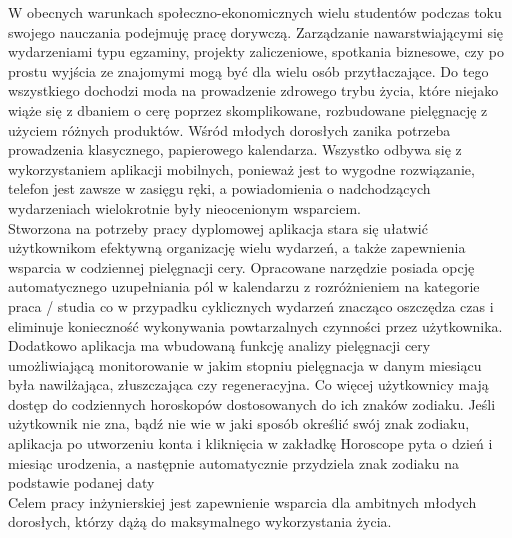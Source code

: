 \phantom{Th} 
W obecnych warunkach społeczno-ekonomicznych wielu studentów podczas toku swojego nauczania podejmuję pracę dorywczą. 
Zarządzanie nawarstwiającymi się wydarzeniami typu egzaminy, projekty zaliczeniowe, spotkania biznesowe, 
czy po prostu wyjścia ze znajomymi mogą być dla wielu osób przytłaczające. 
Do tego wszystkiego dochodzi moda na prowadzenie zdrowego trybu życia, które niejako wiąże się z dbaniem o cerę poprzez skomplikowane,
rozbudowane pielęgnację z użyciem różnych produktów. Wśród młodych dorosłych zanika potrzeba prowadzenia klasycznego, 
papierowego kalendarza. Wszystko odbywa się z wykorzystaniem aplikacji mobilnych, ponieważ jest to wygodne rozwiązanie, 
telefon jest zawsze w zasięgu ręki, a powiadomienia o nadchodzących wydarzeniach wielokrotnie były nieocenionym wsparciem.\\

Stworzona na potrzeby pracy dyplomowej aplikacja stara się ułatwić użytkownikom efektywną organizację wielu wydarzeń,
a także zapewnienia wsparcia w codziennej pielęgnacji cery. Opracowane narzędzie posiada opcję automatycznego uzupełniania pól w kalendarzu
z rozróżnieniem na kategorie praca / studia co w przypadku cyklicznych wydarzeń znacząco oszczędza czas i eliminuje konieczność 
wykonywania powtarzalnych czynności przez użytkownika. Dodatkowo aplikacja ma wbudowaną funkcję analizy pielęgnacji cery umożliwiającą
monitorowanie w jakim stopniu pielęgnacja w danym miesiącu była nawilżająca, złuszczająca czy regeneracyjna. 
Co więcej użytkownicy mają dostęp do codziennych horoskopów dostosowanych do ich znaków zodiaku. 
Jeśli użytkownik nie zna, bądź nie wie w jaki sposób określić swój znak zodiaku, aplikacja po utworzeniu konta i kliknięcia w zakładkę Horoscope 
pyta o dzień i miesiąc urodzenia, a następnie automatycznie przydziela znak zodiaku na podstawie podanej daty\\


Celem pracy inżynierskiej jest zapewnienie wsparcia dla ambitnych młodych dorosłych, którzy dążą do maksymalnego wykorzystania życia.
